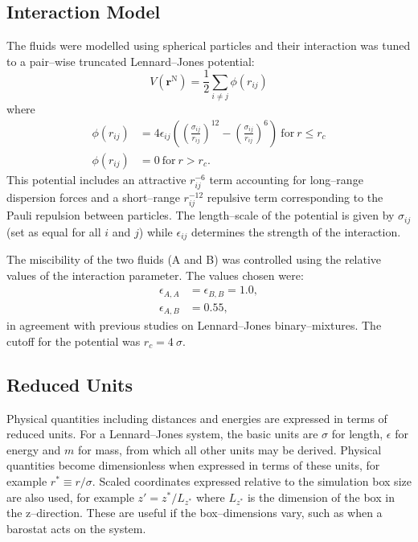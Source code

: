 \subsection{Interaction Model}\label{InteractionModel}
The fluids were modelled using spherical particles and their interaction was tuned to a pair--wise truncated Lennard--Jones potential:
\begin{equation}
V \left( \mathbf{r}^{\mathrm{N}} \right) = \frac{1}{2} \sum_{i\neq j} \phi \left( r_{ij} \right)
\end{equation}
where
\begin{align}
\label{LJ}
\phi \left( r_{ij} \right) &= 4 \epsilon_{ij} \left( \left( \frac{\sigma_{ij}}{r_{ij}}\right)^{12} - \left( \frac{\sigma_{ij}}{r_{ij}}\right)^{6} \right)\ \mathrm{for}\ r \leq r_{c}\\
\phi \left( r_{ij} \right) &= 0\ \mathrm{for}\ r > r_{c}.
\end{align}
This potential includes an attractive $r_{ij}^{-6}$ term accounting for long--range dispersion forces and a short--range $r_{ij}^{-12}$ repulsive term corresponding to the Pauli repulsion between particles.
The length--scale of the potential is given by $\sigma_{ij}$ (set as equal for all $i$ and $j$) while $\epsilon_{ij}$ determines the strength of the interaction. 

The miscibility of the two fluids (A and B) was controlled using the relative values of the interaction parameter.
The values chosen were:
\begin{align}
\epsilon_{A,A} &= \epsilon_{B,B} = 1.0,\\
\epsilon_{A,B} &= 0.55,
\end{align}
in agreement with previous studies on Lennard--Jones binary--mixtures.\cite{MorenzoRazo,Blas,HolgerBoppHampe}
The cutoff for the potential was $r_{c} = 4\ \sigma$.

\subsection{Reduced Units}\label{ReducedUnits}
Physical quantities including distances and energies are expressed in terms of reduced units.
For a Lennard--Jones system, the basic units are $\sigma$ for length, $\epsilon$ for energy and $m$ for mass, from which all other units may be derived.\cite{FrenkelSmit}
Physical quantities become dimensionless when expressed in terms of these units, for example $r^{*} \equiv r / \sigma$.
Scaled coordinates expressed relative to the simulation box size are also used, for example $z' = z^{*} / L_{z^{*}}$ where $L_{z^{*}}$ is the dimension of the box in the z--direction.
These are useful if the box--dimensions vary, such as when a barostat acts on the system.

